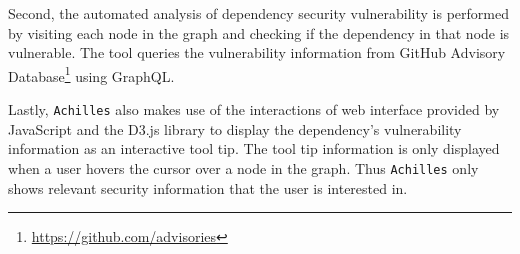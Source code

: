 \documentclass[conference]{IEEEtran}
\begin{document}
	Second, the automated analysis of dependency security vulnerability is performed by visiting each node in the graph and checking if the dependency in that node is vulnerable. The tool queries the vulnerability information from GitHub Advisory Database\footnote{\url{https://github.com/advisories}} using GraphQL. 
	
	Lastly, \texttt{Achilles} also makes use of the interactions of web interface provided by JavaScript and the D3.js library to display the dependency's vulnerability information as an interactive tool tip. The tool tip information is only displayed when a user hovers the cursor over a node in the graph.
	Thus \texttt{Achilles} only shows relevant security information that the user is interested in. 
	
	
	
\end{document}
